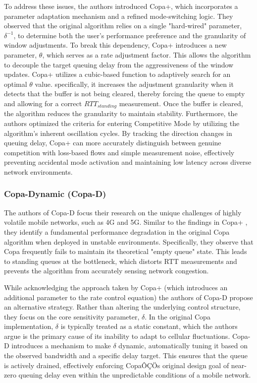 \documentclass[conference]{IEEEtran}
\begin{document}
To address these issues, the authors introduced Copa+, which incorporates a parameter adaptation mechanism and a refined mode-switching logic\cite{COPAPLUS}. 
They observed that the original algorithm relies on a single "hard-wired" parameter, $\delta^{-1}$, to determine both the user's performance preference and the granularity of window adjustments. 
To break this dependency, Copa+ introduces a new parameter, $\theta$, which serves as a rate adjustment factor. 
This allows the algorithm to decouple the target queuing delay from the aggressiveness of the window updates. 
Copa+ utilizes a cubic-based function to adaptively search for an optimal $\theta$ value.
specifically, it increases the adjustment granularity when it detects that the buffer is not being cleared, thereby forcing the queue to empty and allowing for a correct $RTT_{standing}$ measurement. 
Once the buffer is cleared, the algorithm reduces the granularity to maintain stability. 
Furthermore, the authors optimized the criteria for entering Competitive Mode by utilizing the algorithm's inherent oscillation cycles. 
By tracking the direction changes in queuing delay, Copa+ can more accurately distinguish between genuine competition with loss-based flows and simple measurement noise, effectively preventing accidental mode activation and maintaining low latency across diverse network environments.

\subsubsection{Copa-Dynamic (Copa-D)}

The authors of Copa-D focus their research on the unique challenges of highly volatile mobile networks, such as 4G and 5G\cite{COPADYNAMIC}. 
Similar to the findings in Copa+ \cite{COPAPLUS}, they identify a fundamental performance degradation in the original Copa algorithm when deployed in unstable environments\cite{COPADYNAMIC}. 
Specifically, they observe that Copa frequently fails to maintain its theoretical "empty queue" state. 
This leads to standing queues at the bottleneck, which distorts RTT measurements and prevents the algorithm from accurately sensing network congestion.

While acknowledging the approach taken by Copa+ (which introduces an additional parameter to the rate control equation) the authors of Copa-D propose an alternative strategy. 
Rather than altering the underlying control structure, they focus on the core sensitivity parameter, $\delta$.
In the original Copa implementation, $\delta$ is typically treated as a static constant, which the authors argue is the primary cause of its inability to adapt to cellular fluctuations. 
Copa-D introduces a mechanism to make $\delta$ dynamic, automatically tuning it based on the observed bandwidth and a specific delay target. 
This ensures that the queue is actively drained, effectively enforcing CopaÔÇÖs original design goal of near-zero queuing delay even within the unpredictable conditions of a mobile network.
\end{document}
